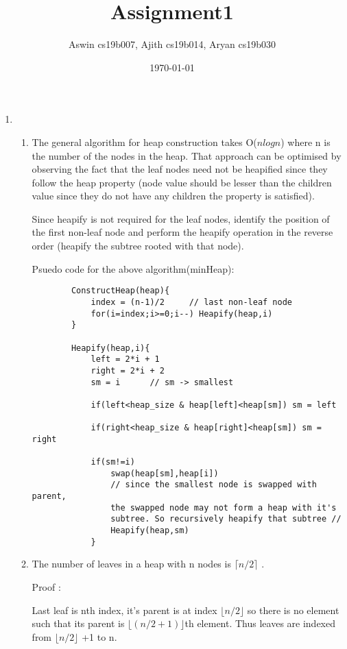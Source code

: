 \documentclass[12pt]{article}
\title{Assignment1}
\author{Aswin cs19b007, Ajith cs19b014, Aryan cs19b030}
\date{\today}
\begin{document}
\maketitle

\newpage
\begin{enumerate}
    \item\begin{enumerate}
        \item The general algorithm for heap construction takes O($nlogn$) where n is the number of the nodes in the heap. That approach can be optimised by observing the fact that the leaf nodes need not be  heapified since they follow the heap property (node value should be lesser than the children value since they do not have any children the property is satisfied). 
        
        Since heapify is not required for the leaf nodes, identify the position of the first non-leaf node and perform the heapify operation in the reverse order (heapify the subtree rooted with that node). 
        
        Psuedo code for the above algorithm(minHeap):
        \begin{verbatim}
        ConstructHeap(heap){
            index = (n-1)/2     // last non-leaf node
            for(i=index;i>=0;i--) Heapify(heap,i)
        }
        
        Heapify(heap,i){
            left = 2*i + 1
            right = 2*i + 2
            sm = i      // sm -> smallest
            
            if(left<heap_size & heap[left]<heap[sm]) sm = left 
            
            if(right<heap_size & heap[right]<heap[sm]) sm = right 
            
            if(sm!=i) 
                swap(heap[sm],heap[i])
                // since the smallest node is swapped with parent, 
                the swapped node may not form a heap with it's 
                subtree. So recursively heapify that subtree //
                Heapify(heap,sm) 
            }
        \end{verbatim}
        
        \item The number of leaves in a heap with n nodes is $\lceil n/2 \rceil$ .
        
        Proof : 
        
        Last leaf is nth index, it's parent is at index $\lfloor n/2 \rfloor$ so
        there is no element such that its parent is $\lfloor (n/2 +1) \rfloor$th element.
        Thus leaves are indexed from $\lfloor n/2 \rfloor$ +1 to n.


\end{enumerate}
\end{enumerate}
\end{document}
